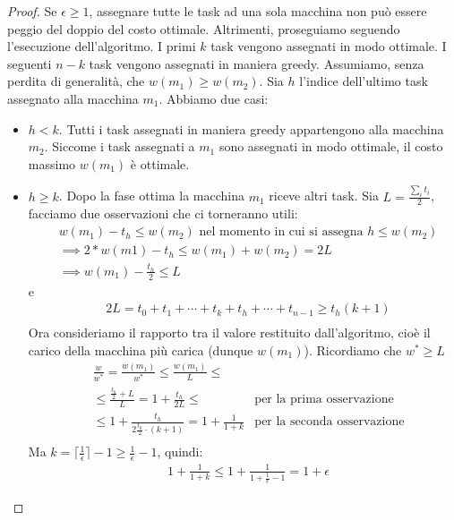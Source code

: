 \begin{proof}
	Se $\epsilon \geq 1$, assegnare tutte le task ad una sola macchina non può
	essere peggio del doppio del costo ottimale.
	Altrimenti, proseguiamo seguendo l'esecuzione dell'algoritmo.
	I primi $k$ task vengono assegnati in modo ottimale. I seguenti $n - k$ task
	vengono assegnati in maniera greedy. Assumiamo, senza perdita di generalità,
	che $w(m_1) \geq w(m_2)$. Sia $h$ l'indice dell'ultimo task assegnato alla
	macchina $m_1$. Abbiamo due casi:
	\begin{itemize}
		\item $h < k$. Tutti i task assegnati in maniera greedy appartengono alla
		      macchina $m_2$. Siccome i task assegnati a $m_1$ sono assegnati in
		      modo ottimale, il costo massimo $w(m_1)$ è ottimale.
		\item $h \geq k$. Dopo la fase ottima la macchina $m_1$ riceve altri task.
		      Sia $L = \frac{\sum_{i} t_i}{2}$, facciamo due osservazioni che ci 
			  torneranno utili:
		      \begin{align*}
			       & w(m_1) - t_h  \leq w(m_2) \text{ nel momento in cui si assegna } h \leq w(m_2)                        \\
			       & \implies 2*w(m1) - t_h \leq w(m_1) + w(m_2) = 2L                                                      \\
			       & \implies w(m_1) - \frac{t_h}{2} \leq L
			  \end{align*}
			  e
			  \begin{align*}
				   & 2L  = t_0 + t_1 + \cdots + t_k + t_h + \cdots + t_{n-1} \geq t_h (k+1)                                \\
			  \end{align*}
			  Ora consideriamo il rapporto tra il valore restituito dall'algoritmo,
			  cioè il carico della macchina più carica (dunque $w(m_1)$). Ricordiamo che
			  $w^* \geq L$
			  \begin{align*}
				   & \frac{w}{w^*} = \frac{w(m_1)}{w^*} \leq \frac{w(m_1)}{L} \leq                                         \\
				   & \leq \frac{\frac{t_h}{2}+L}{L} = 1 + \frac{t_h}{2L} \leq & \text{per la prima osservazione}           \\
				   & \leq 1 + \frac{t_h}{2 \frac{t_h}{2} \cdot (k + 1)} = 1 + \frac{1}{1 + k} & \text{per la seconda osservazione} \\
		      \end{align*}
		      Ma $k = \lceil \frac{1}{\epsilon}\rceil - 1 \geq \frac{1}{\epsilon} - 1$, quindi:
		      \begin{align*}
				   & 1 + \frac{1}{1 + k} \leq 1 + \frac{1}{1 + \frac{1}{\epsilon} - 1} = 1 + \epsilon
		      \end{align*}
	\end{itemize}
\end{proof}

